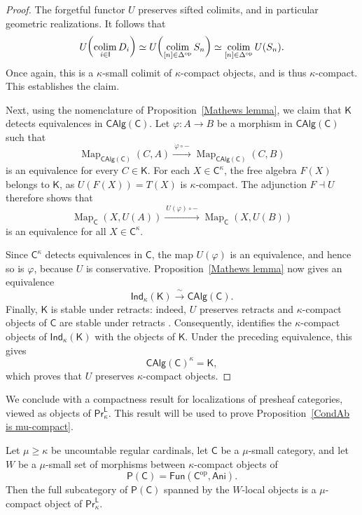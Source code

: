 \begin{proof}
The forgetful functor $U$ preserves sifted colimits, and in particular geometric realizations. It follows that
\[U\mleft(\operatornamewithlimits{colim}_{i\in \mathsf{I}}D_i\mright)\simeq U\mleft(\operatornamewithlimits{colim}_{[n]\in \Delta^\mathrm{op}}S_n\mright)\simeq \operatornamewithlimits{colim}_{[n]\in \Delta^\mathrm{op}} U(S_n).\]
Once again, this is a $\kappa$-small colimit of $\kappa$-compact objects, and is thus $\kappa$-compact. This establishes the claim.

Next, using the nomenclature of Proposition~\ref{Mathews lemma}, we claim that $\mathsf{K}$ detects equivalences in $\mathsf{CAlg}(\mathsf{C})$. Let $\varphi\colon A\to B$ be a morphism in $\mathsf{CAlg}(\mathsf{C})$ such that
\[\operatorname{Map}_{\mathsf{CAlg}(\mathsf{C})}(C,A)\xrightarrow{\ \varphi\circ -\ } \operatorname{Map}_{\mathsf{CAlg}(\mathsf{C})}(C,B)\]
is an equivalence for every $C\in \mathsf{K}$. For each $X\in \mathsf{C}^\kappa$, the free algebra $F(X)$ belongs to $\mathsf{K}$, as $U(F(X))=T(X)$ is $\kappa$-compact. The adjunction $F\dashv U$ therefore shows that
\[\operatorname{Map}_\mathsf{C}(X,U(A))\xrightarrow{\ U(\varphi)\circ -\ } \operatorname{Map}_\mathsf{C}(X,U(B))\]
is an equivalence for all $X\in \mathsf{C}^\kappa$.

Since $\mathsf{C}^\kappa$ detects equivalences in $\mathsf{C}$, the map $U(\varphi)$ is an equivalence, and hence so is $\varphi$, because $U$ is conservative. Proposition~\ref{Mathews lemma} now gives an equivalence
\[\mathsf{Ind}_\kappa(\mathsf{K})\xrightarrow{\ \sim \ } \mathsf{CAlg}(\mathsf{C}).\]
Finally, $\mathsf{K}$ is stable under retracts: indeed, $U$ preserves retracts and $\kappa$-compact objects of $\mathsf{C}$ are stable under retracts \cite[Tag~\href{https://kerodon.net/tag/064Z}{064Z}]{kerodon}. Consequently, \cite[Lem.~5.4.2.4]{lurie2009HTT} identifies the $\kappa$-compact objects of $\mathsf{Ind}_\kappa(\mathsf{K})$ with the objects of $\mathsf{K}$. Under the preceding equivalence, this gives
\[\mathsf{CAlg}(\mathsf{C})^\kappa=\mathsf{K},\]
which proves that $U$ preserves $\kappa$-compact objects.
\end{proof}

We conclude with a compactness result for localizations of presheaf categories, viewed as objects of $\mathsf{Pr}^{\mathsf{L}}_\kappa$. This result will be used to prove Proposition~\ref{CondAb is mu-compact}.

\begin{proposition}\label{compactness of local objects}
Let $\mu\geq \kappa$ be uncountable regular cardinals, let $\mathsf{C}$ be a $\mu$-small category, and let $W$ be a $\mu$-small set of morphisms between $\kappa$-compact objects of
\[\mathsf{P}(\mathsf{C})=\mathsf{Fun}(\mathsf{C}^{\mathrm{op}},\mathsf{Ani}).\]
Then the full subcategory of $\mathsf{P}(\mathsf{C})$ spanned by the $W$-local objects is a $\mu$-compact object of $\mathsf{Pr}^\mathsf{L}_\kappa$.
\end{proposition}

